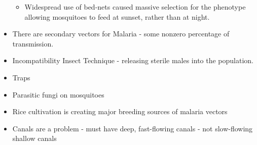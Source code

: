 \documentclass{article}
\begin{document}
\begin{itemize}
        \begin{itemize}
            \item Widespread use of bed-nets caused massive selection for the phenotype allowing mosquitoes to feed at sunset, rather than at night.
        \end{itemize}
        \item There are secondary vectors for Malaria - some nonzero percentage of transmission.
        \item Incompatibility Insect Technique - releasing sterile males into the population.
        \item Traps
        \item Parasitic fungi on mosquitoes
        \item Rice cultivation is creating major breeding sources of malaria vectors
        \item Canals are a problem - must have deep, fast-flowing canals - not slow-flowing shallow canals
    \end{itemize}
\end{document}

